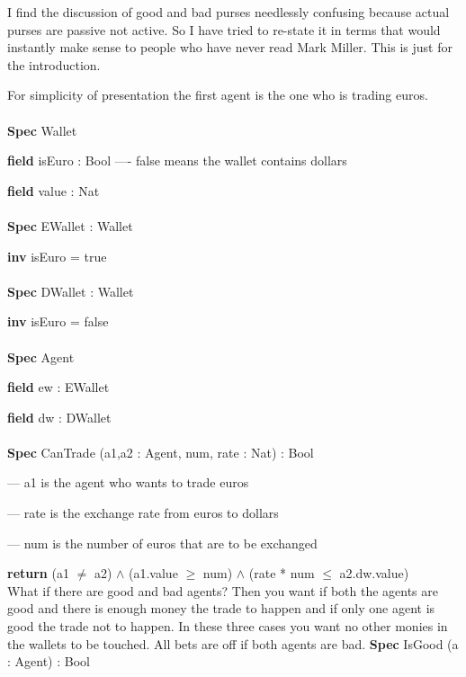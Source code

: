 \documentclass{article}
\date{May 2026}
\begin{document}
\maketitle
\TabPositions{0.75cm}

I find the discussion of good and bad purses needlessly confusing because actual purses are passive not active. So I have tried to re-state it in terms that would instantly make sense to people who have never read Mark Miller. This is just for the introduction.

For simplicity of presentation the first agent is the one who is trading euros.
\\\\
\textbf{Spec} Wallet

\tab\textbf{field} isEuro : Bool  ---- false means the wallet contains dollars
    
\tab\textbf{field} value : Nat
\\ \\    
\textbf{Spec} EWallet : Wallet
   
\tab\textbf{inv} isEuro = true
    \\\\
\textbf{Spec} DWallet : Wallet
  
\tab\textbf{inv} isEuro = false
    \\\\
\textbf{Spec} Agent

\tab\textbf{field} ew : EWallet

\tab\textbf{field} dw : DWallet
\\\\
\textbf{Spec} CanTrade  (a1,a2 : Agent, num, rate : Nat) : Bool

\tab --- a1 is the agent who wants to trade euros

\tab --- rate is the exchange rate from euros to dollars

\tab --- num is the number of euros that are to be exchanged

\tab\textbf{return} (a1 $\neq$ a2)  $\wedge$  (a1.value $\geq$ num) $\wedge$ (rate * num $\leq$ a2.dw.value)\\
       
\rm{What if there are good and bad agents? Then you want if both the agents are good and there is enough money the trade to happen and if only one agent is good the trade not to happen. In these three cases you want no other monies in the wallets to be touched. All bets are off if both agents are bad.}
\newpage
\noindent
\textbf{Spec} IsGood (a : Agent) : Bool
\end{document}
